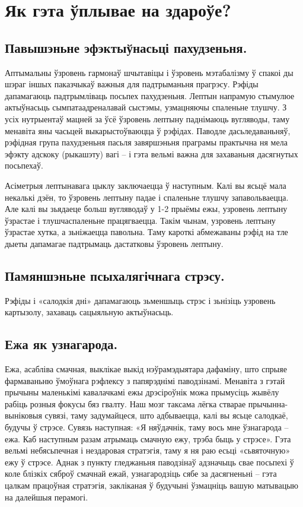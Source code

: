 \section{Як гэта ўплывае на здароўе?}

\subsection{Павышэньне эфэктыўнасьці пахудзеньня.}
Аптымальны ўзровень гармонаў шчытавіцы і ўзровень мэтабалізму ў спакоі ды шэраг іншых паказчыкаў важныя для падтрыманьня прагрэсу. Рэфіды дапамагаюць падтрымліваць посьпех пахудзеньня. Лептын напрамую стымулюе актыўнасьць сымпатаадреналавай сыстэмы, узмацняючы спаленьне тлушчу. З усіх нутрыентаў мацней за ўсё ўзровень лептыну паднімаюць вугляводы, таму менавіта яны часьцей выкарыстоўваюцца ў рэфідах. Паводле дасьледаваньняў, рэфідная група пахудзеньня пасьля завяршэньня праграмы практычна ня мела эфэкту адскоку (рыкашэту) вагі – і гэта вельмі важна для захаваньня дасягнутых посьпехаў.

Асіметрыя лептынавага цыклу заключаецца ў наступным. Калі вы ясьцё мала некалькі дзён, то ўзровень лептыну падае і спаленьне тлушчу запавольваецца. Але калі вы зьядаеце больш вугляводаў у 1-2 прыёмы ежы, узровень лептыну ўзрастае і тлушчаспаленьне працягваецца. Такім чынам, узровень лептыну ўзрастае хутка, а зьніжаецца павольна. Таму кароткі абмежаваны рэфід на тле дыеты дапамагае падтрымаць дастатковы ўзровень лептыну.

\subsection{Памяншэньне псыхалягічнага стрэсу.}
Рэфіды і «салодкія дні» дапамагаюць зьменшыць стрэс і зьнізіць узровень картызолу, захаваць сацыяльную актыўнасьць.

\subsection{Ежа як узнагарода.}
Ежа, асабліва смачная, выклікае выкід нэўрамэдыятара дафаміну, што спрыяе фармаваньню ўмоўнага рэфлексу з папярэднімі паводзінамі. Менавіта з гэтай прычыны маленькімі кавалачкамі ежы дрэсіроўнік можа прымусіць жывёлу рабіць розныя фокусы бяз гвалту. Наш мозг таксама лёгка стварае прычынна-выніковыя сувязі, таму задумайцеся, што адбываецца, калі вы ясьце салодкаё, будучы ў стрэсе. Сувязь наступная: «Я няўдачнік, таму вось мне ўзнагарода – ежа. Каб наступным разам атрымаць смачную ежу, трэба быць у стрэсе». Гэта вельмі небясьпечная і нездаровая стратэгія, таму я ня раю есьці «сьвяточную» ежу ў стрэсе. Аднак з пункту гледжаньня паводзінаў адзначыць свае посьпехі ў коле блізкіх сяброў смачнай ежай, узнагародзіць сябе за дасягненьні – гэта цалкам працоўная стратэгія, закліканая ў будучыні ўзмацніць вашую матывацыю на далейшыя перамогі.

